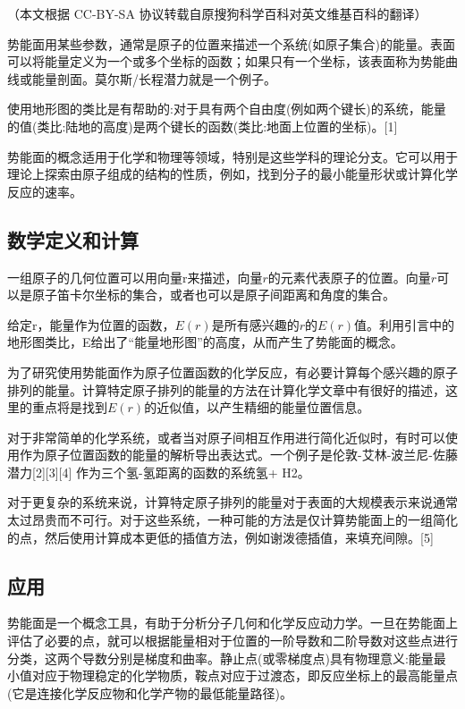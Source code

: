 
（本文根据 CC-BY-SA 协议转载自原搜狗科学百科对英文维基百科的翻译）

势能面用某些参数，通常是原子的位置来描述一个系统(如原子集合)的能量。表面可以将能量定义为一个或多个坐标的函数；如果只有一个坐标，该表面称为势能曲线或能量剖面。莫尔斯/长程潜力就是一个例子。

使用地形图的类比是有帮助的:对于具有两个自由度(例如两个键长)的系统，能量的值(类比:陆地的高度)是两个键长的函数(类比:地面上位置的坐标)。[1]

势能面的概念适用于化学和物理等领域，特别是这些学科的理论分支。它可以用于理论上探索由原子组成的结构的性质，例如，找到分子的最小能量形状或计算化学反应的速率。

\subsection{数学定义和计算}
一组原子的几何位置可以用向量r来描述，向量$r$的元素代表原子的位置。向量$r$可以是原子笛卡尔坐标的集合，或者也可以是原子间距离和角度的集合。

给定r，能量作为位置的函数，$E(r)$是所有感兴趣的$r$的$E(r)$值。利用引言中的地形图类比，E给出了“能量地形图”的高度，从而产生了势能面的概念。

为了研究使用势能面作为原子位置函数的化学反应，有必要计算每个感兴趣的原子排列的能量。计算特定原子排列的能量的方法在计算化学文章中有很好的描述，这里的重点将是找到$E(r)$的近似值，以产生精细的能量位置信息。

对于非常简单的化学系统，或者当对原子间相互作用进行简化近似时，有时可以使用作为原子位置函数的能量的解析导出表达式。一个例子是伦敦-艾林-波兰尼-佐藤潜力[2][3][4] 作为三个氢-氢距离的函数的系统氢+ H2。

对于更复杂的系统来说，计算特定原子排列的能量对于表面的大规模表示来说通常太过昂贵而不可行。对于这些系统，一种可能的方法是仅计算势能面上的一组简化的点，然后使用计算成本更低的插值方法，例如谢泼德插值，来填充间隙。[5]

\subsection{应用}
势能面是一个概念工具，有助于分析分子几何和化学反应动力学。一旦在势能面上评估了必要的点，就可以根据能量相对于位置的一阶导数和二阶导数对这些点进行分类，这两个导数分别是梯度和曲率。静止点(或零梯度点)具有物理意义:能量最小值对应于物理稳定的化学物质，鞍点对应于过渡态，即反应坐标上的最高能量点(它是连接化学反应物和化学产物的最低能量路径)。